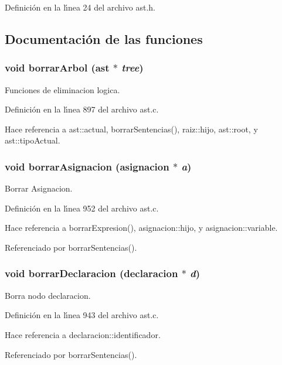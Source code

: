 Definici\'{o}n en la l\'{\i}nea 24 del archivo ast.h.

\subsection{Documentaci\'{o}n de las funciones}
\subsubsection{\setlength{\rightskip}{0pt plus 5cm}void borrar\-Arbol ({\bf ast} $\ast$ {\em tree})}\label{ast_8h_a60}


Funciones de eliminacion logica. 



Definici\'{o}n en la l\'{\i}nea 897 del archivo ast.c.

Hace referencia a ast::actual, borrar\-Sentencias(), raiz::hijo, ast::root, y ast::tipo\-Actual.
\subsubsection{\setlength{\rightskip}{0pt plus 5cm}void borrar\-Asignacion ({\bf asignacion} $\ast$ {\em a})}\label{ast_8h_a63}


Borrar Asignacion. 



Definici\'{o}n en la l\'{\i}nea 952 del archivo ast.c.

Hace referencia a borrar\-Expresion(), asignacion::hijo, y asignacion::variable.

Referenciado por borrar\-Sentencias().
\subsubsection{\setlength{\rightskip}{0pt plus 5cm}void borrar\-Declaracion ({\bf declaracion} $\ast$ {\em d})}\label{ast_8h_a62}


Borra nodo declaracion. 



Definici\'{o}n en la l\'{\i}nea 943 del archivo ast.c.

Hace referencia a declaracion::identificador.

Referenciado por borrar\-Sentencias().
